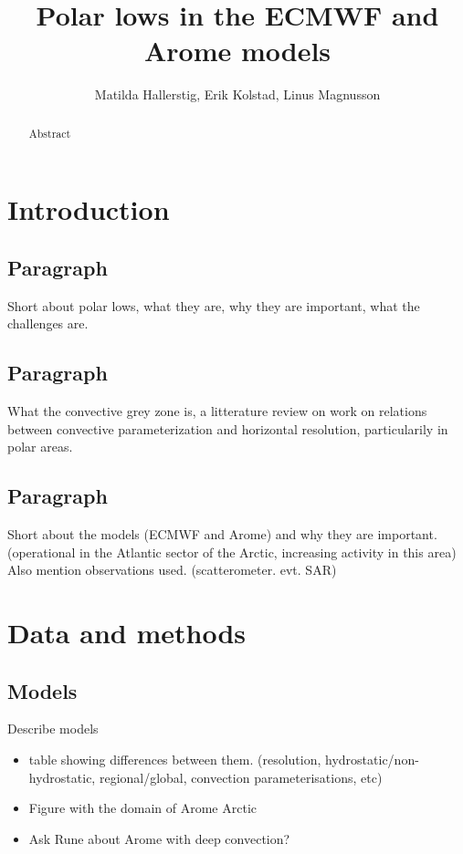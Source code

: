 \documentclass[a4paper,10pt]{article}
\title{Polar lows in the ECMWF and Arome models}
\author{Matilda Hallerstig, Erik Kolstad, Linus Magnusson}
\begin{document}
\maketitle

\begin{abstract}
  Abstract
\end{abstract}

\section{Introduction}

  \subsection{Paragraph}
    Short about polar lows, what they are, why they are important, what the challenges are.
  \subsection{Paragraph}
    What the convective grey zone is, a litterature review on work on relations between convective parameterization and horizontal resolution, particularily in polar areas.
  \subsection{Paragraph}
    Short about the models (ECMWF and Arome) and why they are important. (operational in the Atlantic sector of the Arctic, increasing activity in this area)
    Also mention observations used. (scatterometer. evt. SAR)

\section{Data and methods}

\subsection{Models}
  Describe models
  \begin{itemize}
    \item table showing differences between them. (resolution, hydrostatic/non-hydrostatic, regional/global, convection parameterisations, etc)
    \item Figure with the domain of Arome Arctic 
    \item Ask Rune about Arome with deep convection?
  \end{itemize}
\end{document}

